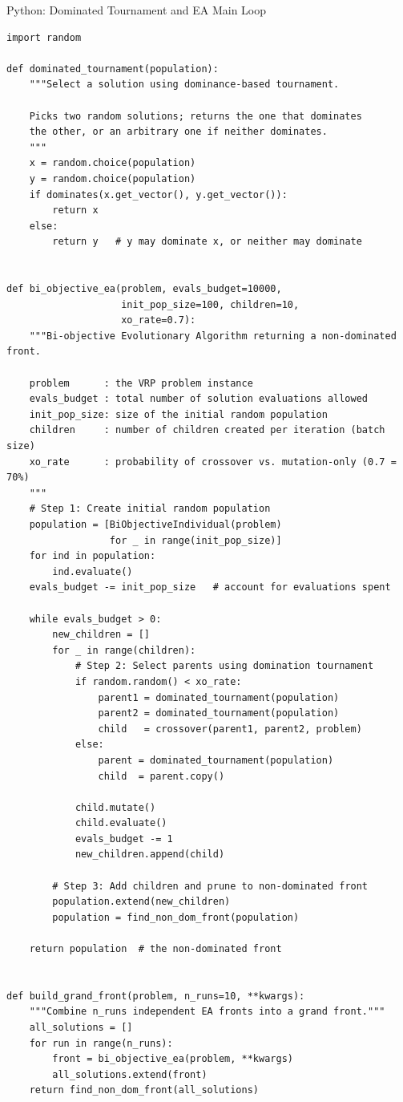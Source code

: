 \documentclass[aspectratio=169,10pt]{beamer}
\begin{document}
\begin{frame}[fragile]{Python: Dominated Tournament and EA Main Loop}
\begin{lstlisting}
import random

def dominated_tournament(population):
    """Select a solution using dominance-based tournament.

    Picks two random solutions; returns the one that dominates
    the other, or an arbitrary one if neither dominates.
    """
    x = random.choice(population)
    y = random.choice(population)
    if dominates(x.get_vector(), y.get_vector()):
        return x
    else:
        return y   # y may dominate x, or neither may dominate


def bi_objective_ea(problem, evals_budget=10000,
                    init_pop_size=100, children=10,
                    xo_rate=0.7):
    """Bi-objective Evolutionary Algorithm returning a non-dominated front.

    problem      : the VRP problem instance
    evals_budget : total number of solution evaluations allowed
    init_pop_size: size of the initial random population
    children     : number of children created per iteration (batch size)
    xo_rate      : probability of crossover vs. mutation-only (0.7 = 70%)
    """
    # Step 1: Create initial random population
    population = [BiObjectiveIndividual(problem)
                  for _ in range(init_pop_size)]
    for ind in population:
        ind.evaluate()
    evals_budget -= init_pop_size   # account for evaluations spent

    while evals_budget > 0:
        new_children = []
        for _ in range(children):
            # Step 2: Select parents using domination tournament
            if random.random() < xo_rate:
                parent1 = dominated_tournament(population)
                parent2 = dominated_tournament(population)
                child   = crossover(parent1, parent2, problem)
            else:
                parent = dominated_tournament(population)
                child  = parent.copy()

            child.mutate()
            child.evaluate()
            evals_budget -= 1
            new_children.append(child)

        # Step 3: Add children and prune to non-dominated front
        population.extend(new_children)
        population = find_non_dom_front(population)

    return population  # the non-dominated front


def build_grand_front(problem, n_runs=10, **kwargs):
    """Combine n_runs independent EA fronts into a grand front."""
    all_solutions = []
    for run in range(n_runs):
        front = bi_objective_ea(problem, **kwargs)
        all_solutions.extend(front)
    return find_non_dom_front(all_solutions)
\end{lstlisting}
\end{frame}
\end{document}
